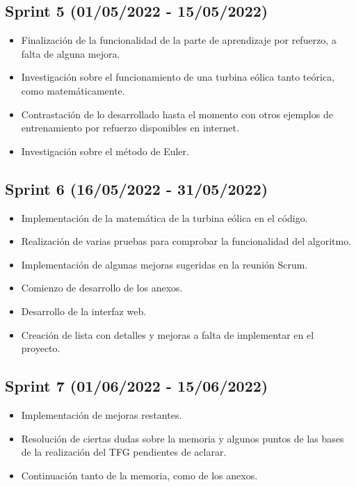 
\subsection{Sprint 5 (01/05/2022 - 15/05/2022)}
\begin{itemize}
    \item Finalización de la funcionalidad de la parte de aprendizaje por refuerzo, a falta de alguna mejora.
    \item Investigación sobre el funcionamiento de una turbina eólica tanto teórica, como matemáticamente.
    \item Contrastación de lo desarrollado hasta el momento con otros ejemplos de entrenamiento por refuerzo disponibles en internet.
    \item Investigación sobre el método de Euler.
\end{itemize}


\subsection{Sprint 6 (16/05/2022 - 31/05/2022)}
\begin{itemize}
    \item Implementación de la matemática de la turbina eólica en el código.
    \item Realización de varias pruebas para comprobar la funcionalidad del algoritmo.
    \item Implementación de algunas mejoras sugeridas en la reunión Scrum.
    \item Comienzo de desarrollo de los anexos.
    \item Desarrollo de la interfaz web.
    \item Creación de lista con detalles y mejoras a falta de implementar en el proyecto.
\end{itemize}


\subsection{Sprint 7 (01/06/2022 - 15/06/2022)}
\begin{itemize}
    \item Implementación de mejoras restantes.
    \item Resolución de ciertas dudas sobre la memoria y algunos puntos de las bases de la realización del TFG pendientes de aclarar.
    \item Continuación tanto de la memoria, como de los anexos.
\end{itemize}

